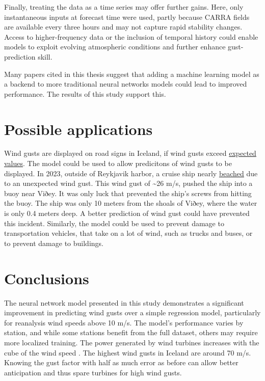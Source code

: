 Finally, treating the data as a time series may offer further gains. Here, only instantaneous inputs at forecast time were used, partly because CARRA fields are available every three hours and may not capture rapid stability changes. Access to higher-frequency data or the inclusion of temporal history could enable models to exploit evolving atmospheric conditions and further enhance gust-prediction skill.

Many papers cited in this thesis suggest that adding a machine learning model as a backend to more traditional neural networks models could lead to improved performance. The results of this study support this.

\section{Possible applications}
Wind gusts are displayed on road signs in Iceland, if wind gusts exceed \href{https://www.vegagerdin.is/vegagerdin/starfsemi/frettir/tvo-ny-vedur-og-upplysingaskilti-i-notkun#}{expected values}. The model could be used to allow predicitons of wind gusts to be displayed. In 2023, outside of Reykjavik harbor, a cruise ship nearly \href{https://www.mbl.is/200milur/frettir/2024/04/26/strand_skemmtiferdaskips_kallar_a_erlenda_adstod/}{beached} due to an unexpected wind gust. This wind gust of \textasciitilde 26 m/s, pushed the ship into a buoy near Viðey. It was only luck that prevented the ship's screws from hitting the buoy. The ship was only 10 meters from the shoals of Viðey, where the water is only 0.4 meters deep. A better prediction of wind gust could have prevented this incident. Similarly, the model could be used to prevent damage to transportation vehicles, that take on a lot of wind, such as trucks and buses, or to prevent damage to buildings.

\section{Conclusions}
The neural network model presented in this study demonstrates a significant improvement in predicting wind gusts over a simple regression model, particularly for reanalysis wind speeds above 10 m/s. The model's performance varies by station, and while some stations benefit from the full dataset, others may require more localized training. The power generated by wind turbines increases with the cube of the wind speed \cite{wind_power}. The highest wind gusts in Iceland are around 70 m/s. Knowing the gust factor with half as much error as before can allow better anticipation and thus spare turbines for high wind gusts. 